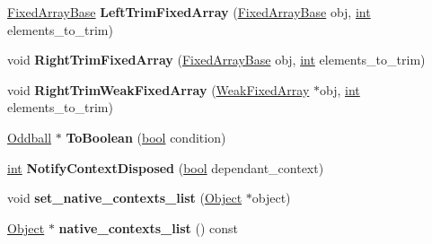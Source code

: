 \begin{DoxyCompactItemize}
\item 
\mbox{\label{classv8_1_1internal_1_1Heap_a94dabe4e7ea800e5b1584f26fa278f3b}} 
\mbox{\hyperlink{classv8_1_1internal_1_1FixedArrayBase}{Fixed\+Array\+Base}} {\bfseries Left\+Trim\+Fixed\+Array} (\mbox{\hyperlink{classv8_1_1internal_1_1FixedArrayBase}{Fixed\+Array\+Base}} obj, \mbox{\hyperlink{classint}{int}} elements\+\_\+to\+\_\+trim)
\item 
\mbox{\label{classv8_1_1internal_1_1Heap_a0ce6e23da43eb409402dcff3a4c57390}} 
void {\bfseries Right\+Trim\+Fixed\+Array} (\mbox{\hyperlink{classv8_1_1internal_1_1FixedArrayBase}{Fixed\+Array\+Base}} obj, \mbox{\hyperlink{classint}{int}} elements\+\_\+to\+\_\+trim)
\item 
\mbox{\label{classv8_1_1internal_1_1Heap_abf69618567bcc8e026652f74a452d503}} 
void {\bfseries Right\+Trim\+Weak\+Fixed\+Array} (\mbox{\hyperlink{classv8_1_1internal_1_1WeakFixedArray}{Weak\+Fixed\+Array}} $\ast$obj, \mbox{\hyperlink{classint}{int}} elements\+\_\+to\+\_\+trim)
\item 
\mbox{\label{classv8_1_1internal_1_1Heap_ac17a02cdcde022ae81bed9c6aac5906c}} 
\mbox{\hyperlink{classv8_1_1internal_1_1Oddball}{Oddball}} $\ast$ {\bfseries To\+Boolean} (\mbox{\hyperlink{classbool}{bool}} condition)
\item 
\mbox{\label{classv8_1_1internal_1_1Heap_a9c497806e47b171bd1bd3cd659ca181e}} 
\mbox{\hyperlink{classint}{int}} {\bfseries Notify\+Context\+Disposed} (\mbox{\hyperlink{classbool}{bool}} dependant\+\_\+context)
\item 
\mbox{\label{classv8_1_1internal_1_1Heap_ae04881430b202c054c546ec445d8d40e}} 
void {\bfseries set\+\_\+native\+\_\+contexts\+\_\+list} (\mbox{\hyperlink{classv8_1_1internal_1_1Object}{Object}} $\ast$object)
\item 
\mbox{\label{classv8_1_1internal_1_1Heap_a42c0e2576b3f2ec9abefa0af445e2673}} 
\mbox{\hyperlink{classv8_1_1internal_1_1Object}{Object}} $\ast$ {\bfseries native\+\_\+contexts\+\_\+list} () const
\item 

\end{DoxyCompactItemize}
